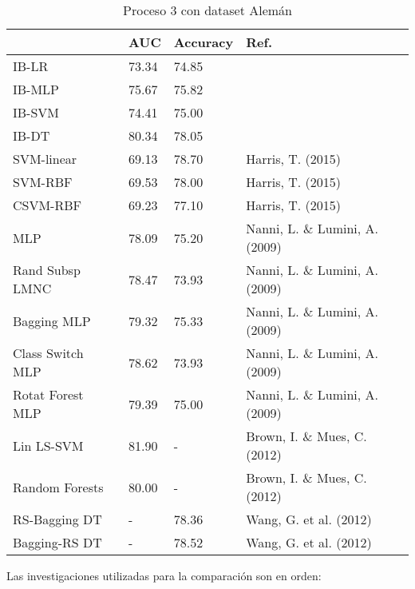 \begin{table}[]
\centering
\caption{Proceso 3 con dataset Alemán}
\label{tab:german-proc3}
\begin{tabularx}{\textwidth}{|l|Y Y l|}
                        \hline
                        & AUC       & Accuracy  & Ref.                                  \\
                        \hline
IB-LR                   & 73.34     & 74.85     &                                       \\
IB-MLP                  & 75.67     & 75.82     &                                       \\
IB-SVM                  & 74.41     & 75.00     &                                       \\
IB-DT                   & 80.34     & 78.05     &                                       \\
                        \hline
SVM-linear              & 69.13     & 78.70     & Harris, T. (2015)                     \\
SVM-RBF                 & 69.53     & 78.00     & Harris, T. (2015)                     \\
CSVM-RBF                & 69.23     & 77.10     & Harris, T. (2015)                     \\
MLP                     & 78.09     & 75.20     & Nanni, L. \& Lumini, A. (2009)        \\
Rand Subsp LMNC         & 78.47     & 73.93     & Nanni, L. \& Lumini, A. (2009)        \\
Bagging MLP             & 79.32     & 75.33     & Nanni, L. \& Lumini, A. (2009)        \\
Class Switch MLP        & 78.62     & 73.93     & Nanni, L. \& Lumini, A. (2009)        \\
Rotat Forest MLP        & 79.39     & 75.00     & Nanni, L. \& Lumini, A. (2009)        \\
Lin LS-SVM              & 81.90     & -         & Brown, I. \& Mues, C. (2012)          \\
Random Forests          & 80.00     & -         & Brown, I. \& Mues, C. (2012)          \\
RS-Bagging DT           & -         & 78.36     & Wang, G. et al. (2012)                \\
Bagging-RS DT           & -         & 78.52     & Wang, G. et al. (2012)                \\
                        \hline
\end{tabularx}
\par
\small
Las investigaciones utilizadas para la comparación son en orden: \cite{harris2015credit, nanni2009experimental, brown2012experimental, wang2012two}
\end{table}

